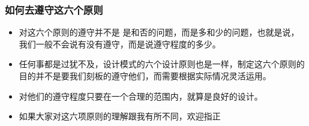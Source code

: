 \documentclass[9pt, b5paper]{article}
\begin{document}
\subsubsection{如何去遵守这六个原则}
\label{sec:org33e015d}
\begin{itemize}
\item 对这六个原则的遵守并不是 是和否的问题，而是多和少的问题，也就是说，我们一般不会说有没有遵守，而是说遵守程度的多少。
\item 任何事都是过犹不及，设计模式的六个设计原则也是一样，制定这六个原则的目的并不是要我们刻板的遵守他们，而需要根据实际情况灵活运用。
\item 对他们的遵守程度只要在一个合理的范围内，就算是良好的设计。
\item 如果大家对这六项原则的理解跟我有所不同，欢迎指正
\end{itemize}
\end{document}
